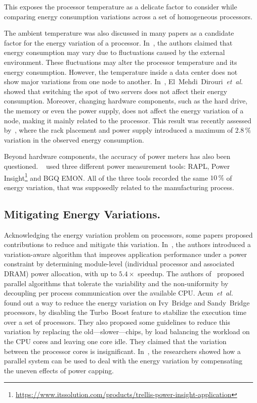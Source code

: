 This exposes the processor temperature as a delicate factor to consider while comparing energy consumption variations across a set of homogeneous processors.%

The ambient temperature was also discussed in many papers as a candidate factor for the energy variation of a processor.
In~\cite{ranka_energy_2009}, the authors claimed that energy consumption may vary due to fluctuations caused by the external environment.
These fluctuations may alter the processor temperature and its energy consumption.
However, the temperature inside a data center does not show major variations from one node to another.
In~\cite{el_mehdi_diouri_your_2013}, El~Mehdi~Dirouri~\emph{et~al.} showed that switching the spot of two servers does not affect their energy consumption.
Moreover, changing hardware components, such as the hard drive, the memory or even the power supply, does not affect the energy variation of a node, making it mainly related to the processor.
This result was recently assessed by~\cite{wang_potential_2018}, where the rack placement and power supply introduced a maximum of $2.8\,\%$ variation in the observed energy consumption.

Beyond hardware components, the accuracy of power meters has also been questioned.
\citeauthor{inadomi_analyzing_2015}~\cite{inadomi_analyzing_2015} used three different power measurement tools: RAPL, Power Insight\footnote{\url{https://www.itssolution.com/products/trellis-power-insight-application}} and BGQ EMON.
All of the three tools recorded the same $10\,\%$ of energy variation, that was supposedly related to the manufacturing process.

\subsection{Mitigating Energy Variations.}
Acknowledging the energy variation problem on processors, some papers proposed contributions to reduce and mitigate this variation.
In~\cite{inadomi_analyzing_2015}, the authors introduced a variation-aware algorithm that improves application performance under a power constraint by determining module-level (individual processor and associated DRAM) power allocation, with up to $5.4\times$ speedup.
The authors of~\cite{hammouda_noise-tolerant_2015} proposed parallel algorithms that tolerate the variability and the non-uniformity by decoupling per process communication over the available CPU.
Acun~\emph{et~al.}~\cite{acun_variation_2016} found out a way to reduce the energy variation on Ivy~Bridge and Sandy~Bridge processors, by disabling the Turbo~Boost feature to stabilize the execution time over a set of processors.
They also proposed some guidelines to reduce this variation by replacing the old---slower---chips, by load balancing the workload on the CPU cores and leaving one core idle.
They claimed that the variation between the processor cores is insignificant.
In~\cite{chasapis_runtime-guided_2016}, the researchers showed how a parallel system can be used to deal with the energy variation by compensating the uneven effects of power capping.

